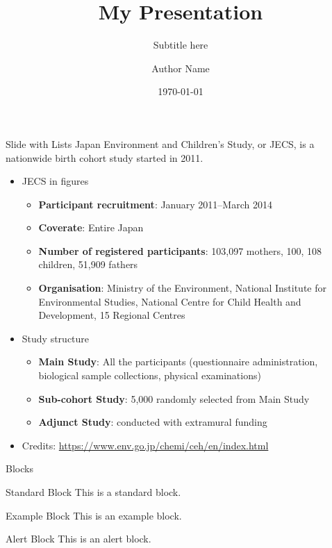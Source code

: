 \documentclass[aspectratio=169]{beamer}
\title{My Presentation}
\subtitle{Subtitle here}
\author{Author Name}
\institute{Affiliation(s)}
\date{\today}
\begin{document}
\titleframe

\begin{frame}[t]{Slide with Lists}
Japan Environment and Children's Study, or JECS, is a nationwide birth cohort study started in 2011.
	\begin{itemize}
		\item JECS in figures
			\begin{itemize}
				\item \textbf{Participant recruitment}: January 2011--March 2014
				\item \textbf{Coverate}: Entire Japan
				\item \textbf{Number of registered participants}: 103,097 mothers, 100, 108 children, 51,909 fathers
				\item \textbf{Organisation}: Ministry of the Environment, National Institute for Environmental Studies, National Centre for Child Health and Development, 15 Regional Centres
			\end{itemize}
		\item Study structure
			\begin{itemize}
				\item \textbf{Main Study}: All the participants (questionnaire administration, biological sample collections, physical examinations)
				\item \textbf{Sub-cohort Study}: 5,000 randomly selected from Main Study
				\item \textbf{Adjunct Study}: conducted with extramural funding
			\end{itemize}
		\item Credits: \url{https://www.env.go.jp/chemi/ceh/en/index.html}
	\end{itemize}
\end{frame}

\begin{frame}[t]{Blocks}
	\begin{block}{Standard Block}
		This is a standard block.
	\end{block}
	
	\begin{exampleblock}{Example Block}
		This is an example block.
	\end{exampleblock}
	
	\begin{alertblock}{Alert Block}
		This is an alert block.
	\end{alertblock}
\end{frame}
\end{document}
